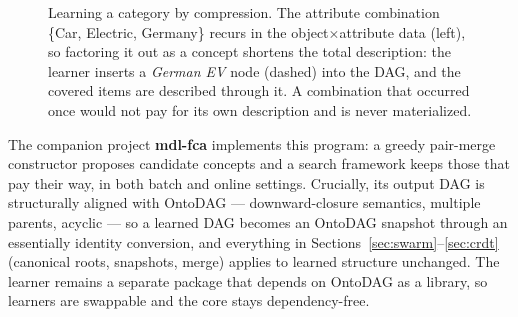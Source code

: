 \documentclass[10pt,twocolumn]{article}
\begin{document}
\begin{figure}[t]
\centering
{}
\caption{Learning a category by compression. The attribute combination
\{Car, Electric, Germany\} recurs in the object$\times$attribute data
(left), so factoring it out as a concept shortens the total description:
the learner inserts a \emph{German EV} node (dashed) into the DAG, and the
covered items are described through it. A combination that occurred once
would not pay for its own description and is never materialized.}
\label{fig:mdl}
\end{figure}

The companion project \textbf{mdl-fca} \cite{mdlfca} implements this
program: a greedy pair-merge constructor proposes candidate concepts and a
search framework keeps those that pay their way, in both batch and online
settings. Crucially, its output DAG is structurally aligned with OntoDAG
--- downward-closure semantics, multiple parents, acyclic --- so a learned
DAG becomes an OntoDAG snapshot through an essentially identity
conversion, and everything in Sections~\ref{sec:swarm}--\ref{sec:crdt}
(canonical roots, snapshots, merge) applies to learned structure
unchanged. The learner remains a separate package that depends on OntoDAG
as a library, so learners are swappable and the core stays dependency-free.
\end{document}
